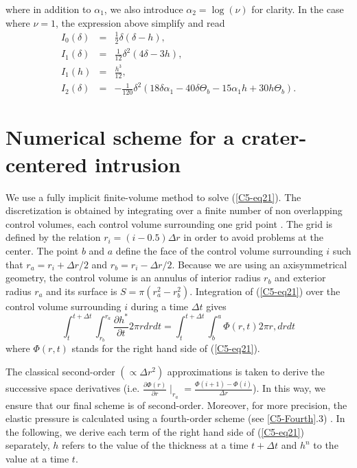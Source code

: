 where    in    addition    to   $\alpha_1$,    we    also    introduce
$\alpha_2=\log(\nu)$  for clarity.   In  the case  where $\nu=1$,  the
expression above simplify and read
\begin{eqnarray}
  I_0(\delta)&=&\frac{1}{2} \delta (\delta -h),\nonumber\\
  I_1(\delta)&=&\frac{1}{12} \delta ^2 (4 \delta -3 h),\nonumber\\
  I_1(h)&=&\frac{h^3}{12},\nonumber\\
  I_2(\delta)&=&-\frac{1}{120} \delta ^2 (18 \delta  \alpha_1-40 \delta  \Theta_b-15 \alpha_1 h+30 h \Theta_b)\nonumber.
\end{eqnarray}

\section{Numerical scheme for a crater-centered intrusion}
\label{A1-sec:numer-scheme-crat}

We   use   a   fully    implicit   finite-volume   method   to   solve
(\ref{C5-eq21}). The discretization is  obtained by integrating over a
finite number of non overlapping  control volumes, each control volume
surrounding  one  grid  point \citep{Patankar:1980vu}.   The  grid  is
defined  by the  relation $r_{i}=(i-0.5)\Delta  r$ in  order to  avoid
problems at the center.  The point $b$  and $a$ define the face of the
control volume surrounding $i$  such that $r_{a}=r_{i}+\Delta r/2$ and
$r_{b}=r_{i}-\Delta  r/2$.  Because  we  are  using an  axisymmetrical
geometry, the  control volume is  an annulus of interior  radius $r_b$
and     exterior    radius     $r_a$     and     its    surface     is
$S=\pi(r_{a}^{2}-r_{b}^{2})$. Integration of  (\ref{C5-eq21}) over the
control volume surrounding $i$ during a time $\Delta t$ gives
\begin{equation}
  \int_{t}^{t+\Delta t} \int_{r_b}^{r_a} \frac{\partial h^{*}}{\partial t} 2\pi r dr dt=\int_{t}^{t+\Delta t} \int_{b}^{a} \Phi(r,t) 2\pi r, dr dt
  \label{C5-eq27}
\end{equation}
where $\Phi(r,t)$ stands for the right hand side of (\ref{C5-eq21}).

The  classical  second-order  $\left   (\propto  \Delta  r^2  \right)$
approximations  is taken  to derive  the successive  space derivatives
(i.e.
$\frac{\partial                                      \Phi(r)}{\partial
  r}\mid_{r_a}=\frac{\Phi(i+1)-\Phi(i)}{\Delta                   r}$).
In   this   way,   we   ensure   that   our   final   scheme   is   of
second-order. Moreover,  for more  precision, the elastic  pressure is
calculated using  a fourth-order  scheme (see \ref{C5-Fourth}.3)  . In
the  following,  we  derive  each  term of  the  right  hand  side  of
(\ref{C5-eq21}) separately, $h$  refers to the value  of the thickness
at a time $t+\Delta t$ and $h^{n}$ to the value at a time $ t$.
